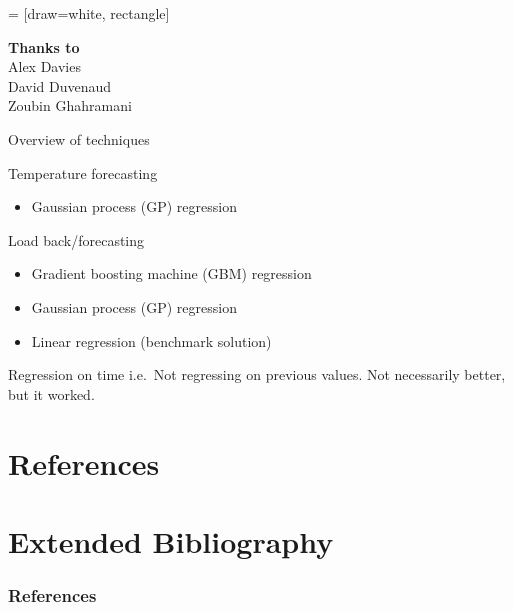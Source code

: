  = [draw=white, rectangle]
\usepackage{ifthen}
\usepackage{booktabs}

\def\simiid{\sim_{\mbox{\tiny iid}}}
\def\ie{i.e.\ }
\def\eg{e.g.\ }




\small

%

\begin{frame}
  \begin{block}{}
    \titlepage
  \end{block}
  \begin{center}
    {\bf  Thanks to}\\
    Alex Davies\\
    David Duvenaud\\
    Zoubin Ghahramani
  \end{center}
\end{frame}

\begin{frame}{Overview of techniques}
  \begin{block}{Temperature forecasting}
    \begin{itemize}
      \item Gaussian process (GP) regression
    \end{itemize}
  \end{block}
  \vspace{\baselineskip}
  \begin{block}{Load back/forecasting}
    \begin{itemize}
      \item Gradient boosting machine (GBM) regression
      \item Gaussian process (GP) regression
      \item Linear regression (benchmark solution)
    \end{itemize}
  \end{block}
\end{frame}

\begin{frame}{Regression on time}
  \ie Not regressing on previous values. Not necessarily better, but it worked.
\end{frame}

{
\section{References}
\section{Extended Bibliography}
\tiny
\begin{frame}
  \frametitle{References}
  
  
\end{frame}
}

